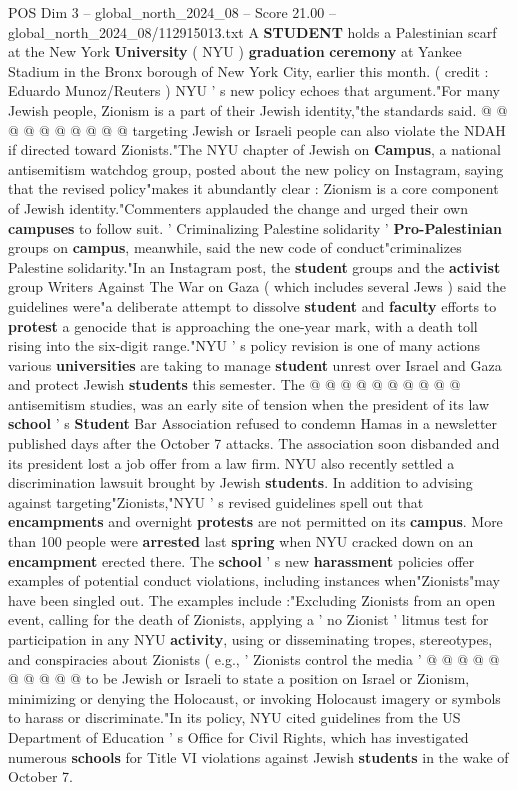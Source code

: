 \begin{textsample}{POS Dim 3 – global\_north\_2024\_08 – Score 21.00 – global\_north\_2024\_08/112915013.txt}
A \textbf{STUDENT} holds a Palestinian scarf at the New York \textbf{University} ( NYU ) \textbf{graduation} \textbf{ceremony} at Yankee Stadium in the Bronx borough of New York City, earlier this month. ( credit : Eduardo Munoz/Reuters ) NYU ' s new policy echoes that argument."For many Jewish people, Zionism is a part of their Jewish identity,"the standards said. @ @ @ @ @ @ @ @ @ @ targeting Jewish or Israeli people can also violate the NDAH if directed toward Zionists."The NYU chapter of Jewish on \textbf{Campus}, a national antisemitism watchdog group, posted about the new policy on Instagram, saying that the revised policy"makes it abundantly clear : Zionism is a core component of Jewish identity."Commenters applauded the change and urged their own \textbf{campuses} to follow suit. ' Criminalizing Palestine solidarity ' \textbf{Pro-Palestinian} groups on \textbf{campus}, meanwhile, said the new code of conduct"criminalizes Palestine solidarity."In an Instagram post, the \textbf{student} groups and the \textbf{activist} group Writers Against The War on Gaza ( which includes several Jews ) said the guidelines were"a deliberate attempt to dissolve \textbf{student} and \textbf{faculty} efforts to \textbf{protest} a genocide that is approaching the one-year mark, with a death toll rising into the six-digit range."NYU ' s policy revision is one of many actions various \textbf{universities} are taking to manage \textbf{student} unrest over Israel and Gaza and protect Jewish \textbf{students} this semester.
The @ @ @ @ @ @ @ @ @ @ antisemitism studies, was an early site of tension when the president of its law \textbf{school} ' s \textbf{Student} Bar Association refused to condemn Hamas in a newsletter published days after the October 7 attacks.
The association soon disbanded and its president lost a job offer from a law firm.
NYU also recently settled a discrimination lawsuit brought by Jewish \textbf{students}.
In addition to advising against targeting"Zionists,"NYU ' s revised guidelines spell out that \textbf{encampments} and overnight \textbf{protests} are not permitted on its \textbf{campus}.
More than 100 people were \textbf{arrested} last \textbf{spring} when NYU cracked down on an \textbf{encampment} erected there.
The \textbf{school} ' s new \textbf{harassment} policies offer examples of potential conduct violations, including instances when"Zionists"may have been singled out.
The examples include :"Excluding Zionists from an open event, calling for the death of Zionists, applying a ' no Zionist ' litmus test for participation in any NYU \textbf{activity}, using or disseminating tropes, stereotypes, and conspiracies about Zionists ( e.g., ' Zionists control the media ' @ @ @ @ @ @ @ @ @ @ to be Jewish or Israeli to state a position on Israel or Zionism, minimizing or denying the Holocaust, or invoking Holocaust imagery or symbols to harass or discriminate."In its policy, NYU cited guidelines from the US Department of Education ' s Office for Civil Rights, which has investigated numerous \textbf{schools} for Title VI violations against Jewish \textbf{students} in the wake of October 7.

\end{textsample}
